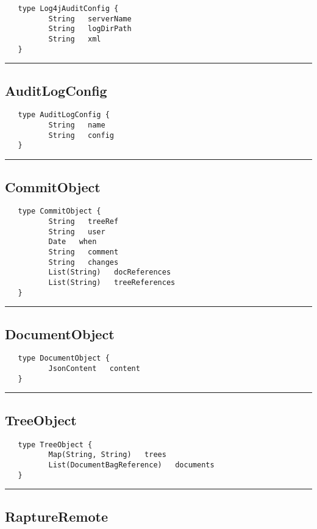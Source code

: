 \begin{verbatim}
   type Log4jAuditConfig {
          String   serverName
          String   logDirPath
          String   xml
   }
\end{verbatim}

\rule{15cm}{2pt}
\subsection{AuditLogConfig}
\label{type:AuditLogConfig}

\begin{verbatim}
   type AuditLogConfig {
          String   name
          String   config
   }
\end{verbatim}

\rule{15cm}{2pt}
\subsection{CommitObject}
\label{type:CommitObject}

\begin{verbatim}
   type CommitObject {
          String   treeRef
          String   user
          Date   when
          String   comment
          String   changes
          List(String)   docReferences
          List(String)   treeReferences
   }
\end{verbatim}

\rule{15cm}{2pt}
\subsection{DocumentObject}
\label{type:DocumentObject}

\begin{verbatim}
   type DocumentObject {
          JsonContent   content
   }
\end{verbatim}

\rule{15cm}{2pt}
\subsection{TreeObject}
\label{type:TreeObject}

\begin{verbatim}
   type TreeObject {
          Map(String, String)   trees
          List(DocumentBagReference)   documents
   }
\end{verbatim}

\rule{15cm}{2pt}
\subsection{RaptureRemote}
\label{type:RaptureRemote}

